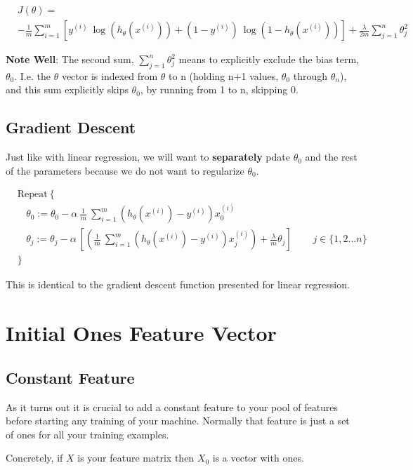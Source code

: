 \begin{equation}
\begin{split}
&J(\theta) = \\
&- \frac{1}{m} \sum_{i=1}^m \left[ y^{(i)}\ \log (h_\theta (x^{(i)})) + (1 - y^{(i)})\ \log (1 - h_\theta(x^{(i)}))\right] + \frac{\lambda}{2m}\sum_{j=1}^n \theta_j^2
\end{split}
\end{equation}	

\textbf{Note Well}: The second sum, $\sum_{j=1}^n \theta_j^2$ means to explicitly exclude the bias term, $\theta_0$. I.e. the $\theta$ vector is indexed from $\theta$ to n (holding n+1 values, $\theta_0$ through $\theta_n$), and this sum explicitly skips $\theta_0$, by running from 1 to n, skipping 0.

\subsection{Gradient Descent}
Just like with linear regression, we will want to \textbf{separately} pdate $\theta_0$ and the rest of the parameters because we do not want to regularize $\theta_0$.

\begin{align*}
& \text{Repeat}\ \lbrace \\
& \ \ \ \ \theta_0 := \theta_0 - \alpha\ \frac{1}{m}\ \sum_{i=1}^m (h_\theta(x^{(i)}) - y^{(i)})x_0^{(i)} \\
& \ \ \ \ \theta_j := \theta_j - \alpha\ \left[ \left( \frac{1}{m}\ \sum_{i=1}^m (h_\theta(x^{(i)}) - y^{(i)})x_j^{(i)} \right) + \frac{\lambda}{m}\theta_j \right] &\ \ \ \ \ \ j \in \lbrace 1,2...n\rbrace\\
& \rbrace
\end{align*}

This is identical to the gradient descent function presented for linear regression.
\section{Initial Ones Feature Vector}
\subsection{Constant Feature}
As it turns out it is crucial to add a constant feature to your pool of features before starting any training of your machine. Normally that feature is just a set of ones for all your training examples.

Concretely, if $X$ is your feature matrix then $X_0$ is a vector with ones.

